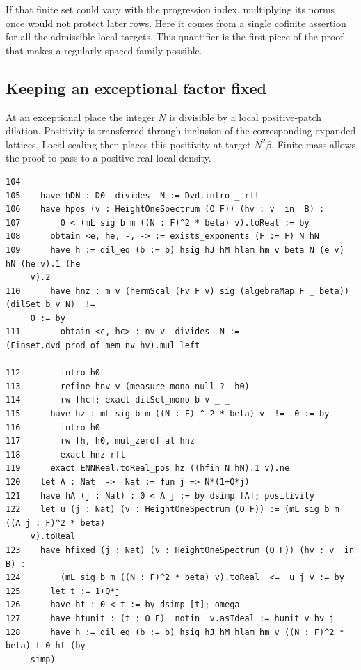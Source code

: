 \documentclass[12pt,letterpaper]{article}
\begin{document}
If that finite set could vary with the progression index, multiplying its norms once would not protect later rows. Here it comes from a single cofinite assertion for all the admissible local targets. This quantifier is the first piece of the proof that makes a regularly spaced family possible.
\clearpage{}\subsection*{Keeping an exceptional factor fixed}\label{extract-ProgressionGrowth104}
At an exceptional place the integer $N$ is divisible by a local positive-patch dilation. Positivity is transferred through inclusion of the corresponding expanded lattices. Local scaling then places this positivity at target $N^2\beta$. Finite mass allows the proof to pass to a positive real local density.
\par
{\fontsize{9.2}{11.2}\selectfont\begin{verbatim}
104
105    have hDN : D0  divides  N := Dvd.intro _ rfl
106    have hpos (v : HeightOneSpectrum (O F)) (hv : v  in  B) :
107        0 < (mL sig b m ((N : F)^2 * beta) v).toReal := by
108      obtain <e, he, -, -> := exists_exponents (F := F) N hN
109      have h := dil_eq (b := b) hsig hJ hM hlam hm v beta N (e v) hN (he v).1 (he
     v).2
110      have hnz : m v (hermScal (Fv F v) sig (algebraMap F _ beta)) (dilSet b v N)  !=
     0 := by
111        obtain <c, hc> : nv v  divides  N := (Finset.dvd_prod_of_mem nv hv).mul_left
     _
112        intro h0
113        refine hnv v (measure_mono_null ?_ h0)
114        rw [hc]; exact dilSet_mono b v _ _
115      have hz : mL sig b m ((N : F) ^ 2 * beta) v  !=  0 := by
116        intro h0
117        rw [h, h0, mul_zero] at hnz
118        exact hnz rfl
119      exact ENNReal.toReal_pos hz ((hfin N hN).1 v).ne
120    let A : Nat  ->  Nat := fun j => N*(1+Q*j)
121    have hA (j : Nat) : 0 < A j := by dsimp [A]; positivity
122    let u (j : Nat) (v : HeightOneSpectrum (O F)) := (mL sig b m ((A j : F)^2 * beta)
     v).toReal
123    have hfixed (j : Nat) (v : HeightOneSpectrum (O F)) (hv : v  in  B) :
124        (mL sig b m ((N : F)^2 * beta) v).toReal  <=  u j v := by
125      let t := 1+Q*j
126      have ht : 0 < t := by dsimp [t]; omega
127      have htunit : (t : O F)  notin  v.asIdeal := hunit v hv j
128      have h := dil_eq (b := b) hsig hJ hM hlam hm v ((N : F)^2 * beta) t 0 ht (by
     simp)
\end{verbatim}}
\end{document}
